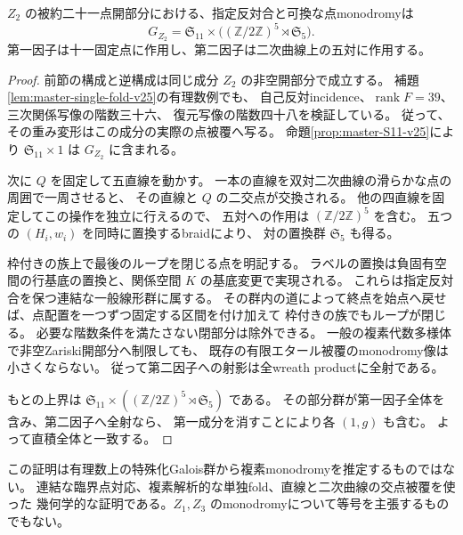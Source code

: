 \begin{theorem}[$Z_2$ の最大monodromy]
\label{thm:master-full-monodromy-v25}
$Z_2$ の被約二十一点開部分における、指定反対合と可換な点monodromyは
\[
 \boxed{\;
 G_{Z_2}=\mathfrak S_{11}\times
       \bigl((\mathbb Z/2\mathbb Z)^5\rtimes\mathfrak S_5\bigr).
 \;}
\]
第一因子は十一固定点に作用し、第二因子は二次曲線上の五対に作用する。
\end{theorem}
\begin{proof}
前節の構成と逆構成は同じ成分 $Z_2$ の非空開部分で成立する。
補題\ref{lem:master-single-fold-v25}の有理数例でも、
自己反対incidence、$\operatorname{rank}F=39$、三次関係写像の階数三十六、
復元写像の階数四十八を検証している。
従って、その重み変形はこの成分の実際の点被覆へ写る。
命題\ref{prop:master-S11-v25}により
$\mathfrak S_{11}\times1$ は $G_{Z_2}$ に含まれる。

次に $Q$ を固定して五直線を動かす。
一本の直線を双対二次曲線の滑らかな点の周囲で一周させると、
その直線と $Q$ の二交点が交換される。
他の四直線を固定してこの操作を独立に行えるので、
五対への作用は $(\mathbb Z/2\mathbb Z)^5$ を含む。
五つの $(H_i,w_i)$ を同時に置換するbraidにより、
対の置換群 $\mathfrak S_5$ も得る。

枠付きの族上で最後のループを閉じる点を明記する。
ラベルの置換は負固有空間の行基底の置換と、関係空間 $K$ の基底変更で実現される。
これらは指定反対合を保つ連結な一般線形群に属する。
その群内の道によって終点を始点へ戻せば、点配置を一つずつ固定する区間を付け加えて
枠付きの族でもループが閉じる。
必要な階数条件を満たさない閉部分は除外できる。
一般の複素代数多様体で非空Zariski開部分へ制限しても、
既存の有限エタール被覆のmonodromy像は小さくならない。
従って第二因子への射影は全wreath productに全射である。

もとの上界は
$\mathfrak S_{11}\times((\mathbb Z/2\mathbb Z)^5\rtimes\mathfrak S_5)$ である。
その部分群が第一因子全体を含み、第二因子へ全射なら、
第一成分を消すことにより各 $(1,g)$ も含む。
よって直積全体と一致する。
\end{proof}

この証明は有理数上の特殊化Galois群から複素monodromyを推定するものではない。
連結な臨界点対応、複素解析的な単独fold、直線と二次曲線の交点被覆を使った
幾何学的な証明である。$Z_1,Z_3$ のmonodromyについて等号を主張するものでもない。
